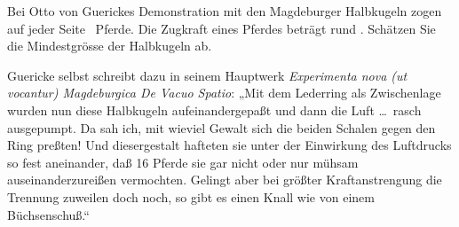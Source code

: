 Bei Otto von Guerickes Demonstration mit den Magdeburger Halbkugeln zogen auf jeder Seite \nPfO\ Pferde. Die Zugkraft eines Pferdes beträgt rund \FPfO. Schätzen Sie die Mindestgrösse der Halbkugeln ab.

Guericke selbst schreibt dazu in seinem Hauptwerk \emph{Experimenta nova (ut vocantur) Magdeburgica De Vacuo Spatio}: „Mit dem Lederring als Zwischenlage wurden nun diese Halbkugeln aufeinandergepaßt und dann die Luft \dots\ rasch ausgepumpt. Da sah ich, mit wieviel Gewalt sich die beiden Schalen gegen den Ring preßten! Und diesergestalt hafteten sie unter der Einwirkung des Luftdrucks so fest aneinander, daß 16 Pferde sie gar nicht oder nur mühsam auseinanderzureißen vermochten. Gelingt aber bei größter Kraftanstrengung die Trennung zuweilen doch noch, so gibt es einen Knall wie von einem Büchsenschuß.“
